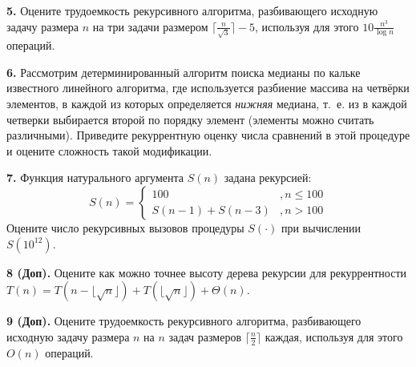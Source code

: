\documentclass[12pt,a5paper,fleqn]{article}
\begin{document}
\smallskip

{\bf 5.} Оцените трудоемкость рекурсивного алгоритма, разбивающего исходную задачу размера $n$ на три задачи размером $\lceil\frac{n}{\sqrt{3}}\rceil-5$, используя для этого $10\frac{n^3}{\log n}$ операций.

\smallskip

{\bf 6.} Рассмотрим детерминированный алгоритм поиска медианы по кальке известного линейного алгоритма, где используется разбиение массива на четвёрки элементов, в каждой из которых определяется \emph{нижняя} медиана, т.~е. из в каждой четверки выбирается второй по порядку элемент (элементы можно считать различными). Приведите рекуррентную оценку числа сравнений в этой процедуре и оцените сложность такой модификации.      

\smallskip

{\bf 7.} Функция натурального аргумента $S(n)$ задана рекурсией:
$$
S(n)=\left\{\begin{array}{cc}
100&, n\leq 100\\
S(n-1)+S(n-3)&, n>100
\end{array}
\right.
$$      
Оцените число рекурсивных вызовов процедуры $S(\cdot)$ при вычислении $S(10^{12})$.      

\smallskip

{\bf 8 (Доп).}  Оцените как можно точнее высоту дерева рекурсии для рекуррентности
$T(n) = T(n-\lfloor \sqrt{n} \rfloor) + T(\lfloor \sqrt{n} \rfloor) + \Theta(n)$.

\smallskip

{\bf 9 (Доп).} Оцените трудоемкость рекурсивного алгоритма, разбивающего исходную задачу размера $n$ на $n$ задач размеров $\lceil \frac n 2 \rceil$ каждая, используя для этого $O(n)$ операций. 

\smallskip
\end{document}
